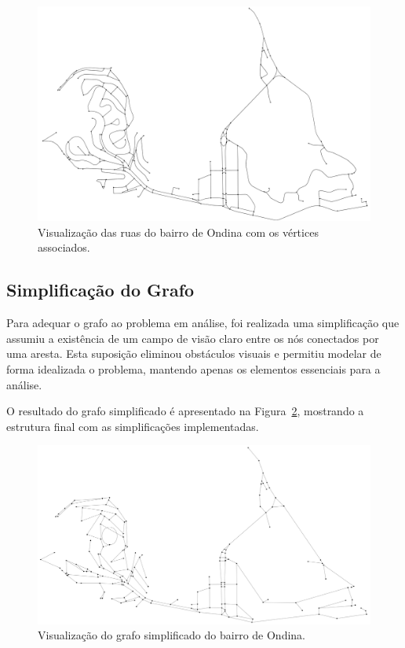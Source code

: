\documentclass[12pt, a4paper]{report}
\begin{document}
\begin{figure}[H]
    \centering
    \includegraphics[width=\textwidth]{ondina_grafo_bruto}
    \caption{Visualização das ruas do bairro de Ondina com os vértices associados.}
    \label{fig:ondina_grafo_bruto}
\end{figure}

\subsection{Simplificação do Grafo}

Para adequar o grafo ao problema em análise, foi realizada uma simplificação que assumiu a existência de um campo de visão claro entre os nós conectados por uma aresta. Esta suposição eliminou obstáculos visuais e permitiu modelar de forma idealizada o problema, mantendo apenas os elementos essenciais para a análise.

O resultado do grafo simplificado é apresentado na Figura~\ref{fig:ondina_grafo_simplificado}, mostrando a estrutura final com as simplificações implementadas.

\begin{figure}[H]
    \centering
    \includegraphics[width=\textwidth]{ondina_grafo_simplificado}
    \caption{Visualização do grafo simplificado do bairro de Ondina.}
    \label{fig:ondina_grafo_simplificado}
\end{figure}
\end{document}
